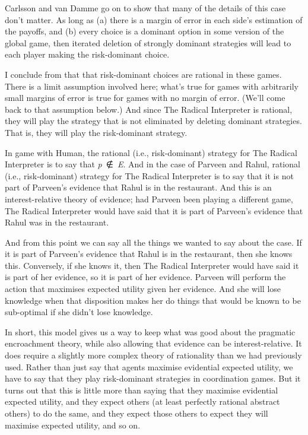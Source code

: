 \documentclass[
  11pt,
  letterpaper,
  DIV=11,
  numbers=noendperiod,
  twoside]{scrartcl}
\begin{document}
Carlsson and van Damme go on to show that many of the details of this
case don't matter. As long as (a) there is a margin of error in each
side's estimation of the payoffs, and (b) every choice is a dominant
option in some version of the global game, then iterated deletion of
strongly dominant strategies will lead to each player making the
risk-dominant choice.

I conclude from that that risk-dominant choices are rational in these
games. There is a limit assumption involved here; what's true for games
with arbitrarily small margins of error is true for games with no margin
of error. (We'll come back to that assumption below.) And since The
Radical Interpreter is rational, they will play the strategy that is not
eliminated by deleting dominant strategies. That is, they will play the
risk-dominant strategy.

In game with Human, the rational (i.e., risk-dominant) strategy for The
Radical Interpreter is to say that \emph{p}~∉~\emph{E}. And in the case
of Parveen and Rahul, rational (i.e., risk-dominant) strategy for The
Radical Interpreter is to say that it is not part of Parveen's evidence
that Rahul is in the restaurant. And this is an interest-relative theory
of evidence; had Parveen been playing a different game, The Radical
Interpreter would have said that it is part of Parveen's evidence that
Rahul was in the restaurant.

And from this point we can say all the things we wanted to say about the
case. If it is part of Parveen's evidence that Rahul is in the
restaurant, then she knows this. Conversely, if she knows it, then The
Radical Interpreter would have said it is part of her evidence, so it is
part of her evidence. Parveen will perform the action that maximises
expected utility given her evidence. And she will lose knowledge when
that disposition makes her do things that would be known to be
sub-optimal if she didn't lose knowledge.

In short, this model gives us a way to keep what was good about the
pragmatic encroachment theory, while also allowing that evidence can be
interest-relative. It does require a slightly more complex theory of
rationality than we had previously used. Rather than just say that
agents maximise evidential expected utility, we have to say that they
play risk-dominant strategies in coordination games. But it turns out
that this is little more than saying that they maximise evidential
expected utility, and they expect others (at least perfectly rational
abstract others) to do the same, and they expect those others to expect
they will maximise expected utility, and so on.
\end{document}
